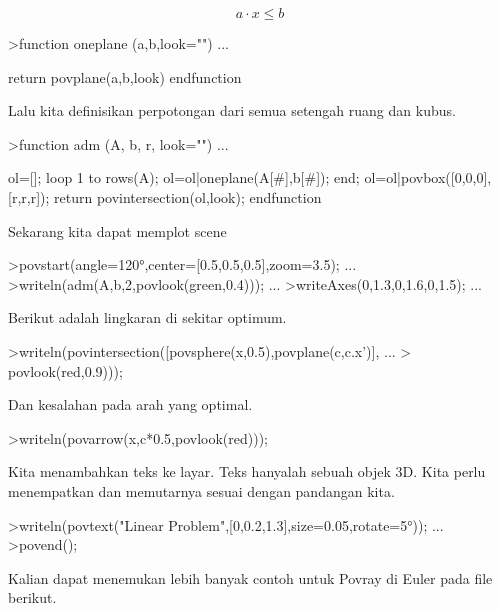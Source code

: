 \documentclass{article}
\begin{document}
\begin{eulernotebook}
\begin{eulercomment}
\end{eulercomment}
\begin{eulerformula}
\[
a \cdot x \le b
\]
\end{eulerformula}
\begin{eulerprompt}
>function oneplane (a,b,look="") ...
\end{eulerprompt}
\begin{eulerudf}
    return povplane(a,b,look)
  endfunction
\end{eulerudf}
\begin{eulercomment}
Lalu kita definisikan perpotongan dari semua setengah ruang dan kubus.
\end{eulercomment}
\begin{eulerprompt}
>function adm (A, b, r, look="") ...
\end{eulerprompt}
\begin{eulerudf}
    ol=[];
    loop 1 to rows(A); ol=ol|oneplane(A[#],b[#]); end;
    ol=ol|povbox([0,0,0],[r,r,r]);
    return povintersection(ol,look);
  endfunction
\end{eulerudf}
\begin{eulercomment}
Sekarang kita dapat memplot scene
\end{eulercomment}
\begin{eulerprompt}
>povstart(angle=120°,center=[0.5,0.5,0.5],zoom=3.5); ...
>writeln(adm(A,b,2,povlook(green,0.4))); ...
>writeAxes(0,1.3,0,1.6,0,1.5); ...
\end{eulerprompt}
\begin{eulercomment}
Berikut adalah lingkaran di sekitar optimum.
\end{eulercomment}
\begin{eulerprompt}
>writeln(povintersection([povsphere(x,0.5),povplane(c,c.x')], ...
>  povlook(red,0.9)));
\end{eulerprompt}
\begin{eulercomment}
Dan kesalahan pada arah yang optimal.
\end{eulercomment}
\begin{eulerprompt}
>writeln(povarrow(x,c*0.5,povlook(red)));
\end{eulerprompt}
\begin{eulercomment}
Kita menambahkan teks ke layar. Teks hanyalah sebuah objek 3D. Kita
perlu menempatkan dan memutarnya sesuai dengan pandangan kita.
\end{eulercomment}
\begin{eulerprompt}
>writeln(povtext("Linear Problem",[0,0.2,1.3],size=0.05,rotate=5°)); ...
>povend();
\end{eulerprompt}
\begin{eulercomment}
Kalian dapat menemukan lebih banyak contoh untuk Povray di Euler pada
file berikut.


\end{eulercomment}
\end{eulernotebook}
\end{document}
